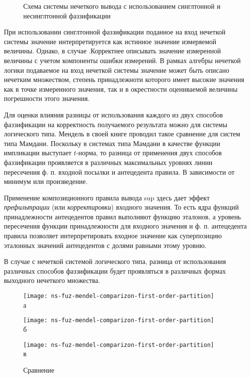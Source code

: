 \begin{figure}[ht]
	\caption{Схема системы нечеткого вывода с использованием синглтонной и несинглтонной фаззификации}\label{fig:singleton-vs-nonsingleton}
\end{figure}

При использовании синглтонной фаззификации поданное на вход нечеткой системы значение интерпретируется как истинное значение измеряемой величины. Однако, в случае .Корректнее описывать значение измеренной величины с учетом компоненты ошибки измерений. В рамках алгебры нечеткой логики подаваемое на вход нечеткой системы значение может быть описано нечетким множеством, степень принадлежноти которого имеет высокие значения как в точке измеренного значения, так и в окрестности оцениваемой величины погрешности этого значения.

Для оценки влияния разницы от использования каждого из двух способов фаззификации на корректность получаемого результата можно для системы логического типа. Мендель в своей книге проводил такое сравнение для систем типа Мамдани. Поскольку в системах типа Мамдани в качестве функции импликации выступает $t$-норма, то разница от применения двух способов фаззификации проявляется в различных максимальных уровнях линии пересечения ф. п. входной посылки и антецедента правила. В зависимости от минимум или произведение. 

Применение композиционного правила вывода sup здесь дает эффект \textit{префильтрации} (или \textit{корректировки}) входного значения. То есть ядра функций принадлежности антецедентов правил выполняют функцию эталонов, а уровень пересечения функции принадлежности для входного значения и ф. п. антецедента правила позволяет интерпретировать входное значение как суперпозицию эталонных значений антецедентов с долями равными этому уровню.

В случае с нечеткой системой логического типа, разница от использования различных способов фаззификации будет проявляться в различных формах выходного нечеткого множества. 

\begin{figure}[ht]
	\begin{minipage}[b][][b]{0.3\linewidth}
		\centering
		\texttt{[image: ns-fuz-mendel-comparizon-first-order-partition]} \\ а
	\end{minipage}
	\hfill
	\begin{minipage}[b][][b]{0.3\linewidth}
		\centering
		\texttt{[image: ns-fuz-mendel-comparizon-first-order-partition]} \\ б
	\end{minipage}
	\hfill
	\begin{minipage}[b][][b]{0.3\linewidth}
		\centering
		\texttt{[image: ns-fuz-mendel-comparizon-first-order-partition]} \\ в
	\end{minipage}

    \caption{Сравнение }
\end{figure}

